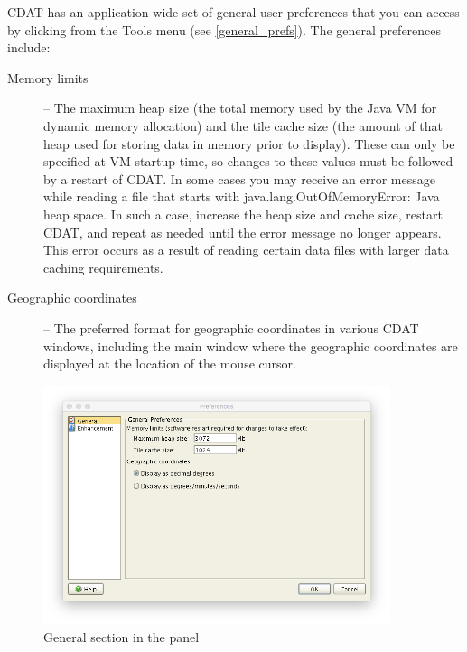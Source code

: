 CDAT has an application-wide set of general user preferences that you can
access by clicking  from the {\gui Tools}
menu (see \autoref{general_prefs}).  The general preferences include:
\begin{description}

\item[Memory limits] -- The maximum heap size (the total memory used
by the Java VM for dynamic memory allocation) and the tile cache size (the
amount of that heap used for storing data in memory prior to display).  These
can only be specified at VM startup time, so changes to these values must be
followed by a restart of CDAT.  In some cases you may receive an error message
while reading a file that starts with {\file java.lang.OutOfMemoryError: Java
heap space}.  In such a case, increase the heap size and cache size, restart
CDAT, and repeat as needed until the error message no longer appears.  This
error occurs as a result of reading certain data files with larger data caching
requirements.

\item[Geographic coordinates] -- The preferred format for geographic
coordinates in various CDAT windows, including the main window where the
geographic coordinates are displayed at the location of the mouse cursor.

\end{description}

\begin{figure}
  \begin{center}
    \includegraphics[width=4in]{figures/general_prefs.png}
    \caption[General section in the Preferences panel]{
       {\gui General} section in the
        panel
    }
    \label{general_prefs}
  \end{center}
\end{figure}

